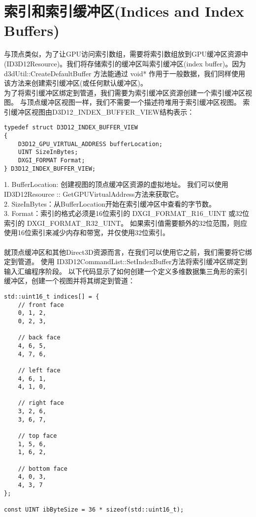 \section{索引和索引缓冲区(Indices and Index Buffers)}
\begin{flushleft}
与顶点类似，为了让GPU访问索引数组，需要将索引数组放到GPU缓冲区资源中(ID3D12Resource)。我们将存储索引的缓冲区叫索引缓冲区(index buffer)。因为 d3dUtil::CreateDefaultBuffer 方法能通过 void* 作用于一般数据，我们同样使用该方法来创建索引缓冲区(或任何默认缓冲区)。\\
为了将索引缓冲区绑定到管道，我们需要为索引缓冲区资源创建一个索引缓冲区视图。 与顶点缓冲区视图一样，我们不需要一个描述符堆用于索引缓冲区视图。 索引缓冲区视图由D3D12\_INDEX\_BUFFER\_VIEW结构表示：\\
\begin{lstlisting}
typedef struct D3D12_INDEX_BUFFER_VIEW
{
    D3D12_GPU_VIRTUAL_ADDRESS bufferLocation;
    UINT SizeInBytes;
    DXGI_FORMAT Format;
} D3D12_INDEX_BUFFER_VIEW;
\end{lstlisting}
1. BufferLocation: 创建视图的顶点缓冲区资源的虚拟地址。 我们可以使用ID3D12Resource :: GetGPUVirtualAddress方法来获取它。\\
2. SizeInBytes：从BufferLocation开始在索引缓冲区中查看的字节数。\\
3. Format：索引的格式必须是16位索引的 DXGI\_FORMAT\_R16\_UINT 或32位索引的 DXGI\_FORMAT\_R32\_UINT。 如果索引值需要额外的32位范围，则应使用16位索引来减少内存和带宽，并仅使用32位索引。\\
~\\
就顶点缓冲区和其他Direct3D资源而言，在我们可以使用它之前，我们需要将它绑定到管道。 使用 ID3D12CommandList::SetIndexBuffer方法将索引缓冲区绑定到输入汇编程序阶段。 以下代码显示了如何创建一个定义多维数据集三角形的索引缓冲区，创建一个视图并将其绑定到管道：\\
\begin{lstlisting}
std::uint16_t indices[] = {
    // front face
    0, 1, 2,
    0, 2, 3,
    
    // back face
    4, 6, 5,
    4, 7, 6,
    
    // left face
    4, 6, 1,
    4, 1, 0,
    
    // right face
    3, 2, 6,
    3, 6, 7,
    
    // top face
    1, 5, 6,
    1, 6, 2,
    
    // bottom face
    4, 0, 3,
    4, 3, 7
};

const UINT ibByteSize = 36 * sizeof(std::uint16_t);


\end{lstlisting}
\end{flushleft}
